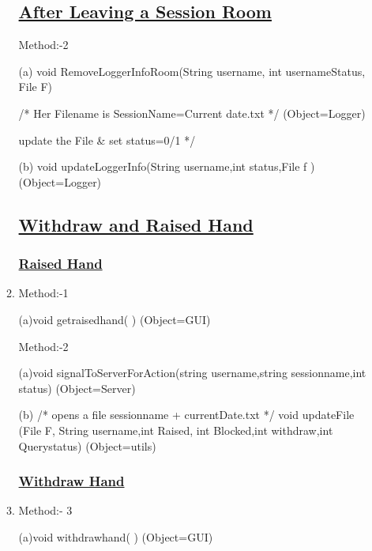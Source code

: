 \documentclass{article}
\begin{document}
\begin{enumerate}
\begin{enumerate}
\subsection*{\underline{After Leaving a Session Room}}
Method:-2 

(a) void RemoveLoggerInfoRoom(String username, int usernameStatus, File F) 

/*  Her Filename is SessionName=Current date.txt  */     (Object=Logger) 

               update the File \& set  
                               status=0/1                 */ 
 
(b) void updateLoggerInfo(String username,int status,File f )                       (Object=Logger) 

\subsection*{\underline{Withdraw  and Raised Hand}}
\subsubsection*{\underline{Raised Hand}}

\item[{}{}]

Method:-1 

(a)void getraisedhand( )                            (Object=GUI) 

Method:-2 

(a)void signalToServerForAction(string username,string sessionname,int status)        (Object=Server) 

(b)  /* opens a file sessionname + currentDate.txt  */ 
void updateFile (File F, String username,int Raised, int Blocked,int withdraw,int Querystatus)                                              (Object=utils) 
\begin{center}

\label{figure:brihSync_Withdrow_Raisedhand.latex}
\end{center}

\subsubsection*{\underline{Withdraw Hand}} 
\item[{}{}]

Method:- 3      

(a)void withdrawhand( )                     (Object=GUI)            


\end{enumerate}
\end{enumerate}
\end{document}
